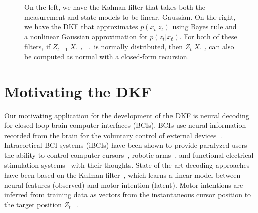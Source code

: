 \begin{figure}[h]
\begin{minipage}[t]{.45\textwidth}
\end{minipage}%
\hfill
\begin{minipage}[t]{.45\textwidth}
\end{minipage}
\caption[A side-by-side comparison of the Kalman and Discriminative Kalman Filtering approaches]{On the left, we have the Kalman filter that takes both the measurement and state models to be linear, Gaussian.  On the right, we have the DKF that approximates $p(x_t|z_t)$ using Bayes rule and a nonlinear Gaussian approximation for $p(z_t|x_t)$.  For both of these filters, if $Z_{t-1}|X_{1:t-1}$ is normally distributed, then $Z_t|X_{1:t}$ can also be computed as normal with a closed-form recursion.}
\end{figure}

\section{Motivating the DKF}

Our motivating application for the development of the DKF is neural decoding for closed-loop brain computer interfaces (BCIs). BCIs use neural information recorded from the brain for the voluntary control of external devices~\cite{Wol02, Hoc06, Bra17}. Intracortical BCI systems (iBCIs) have been shown to provide paralyzed users the ability to control computer cursors~\cite{Pan15, Jar15}, robotic arms~\cite{Hoc12}, and functional electrical stimulation systems~\cite{Bou16,Aji17} with their thoughts. State-of-the-art decoding approaches have been based on the Kalman filter~\cite{Pan17, Jar15, Gil15}, which learns a linear model between neural features (observed) and motor intention (latent). Motor intentions are inferred from training data as vectors from the instantaneous cursor position to the target position $Z_t$ ~\cite{Bra18}. 

